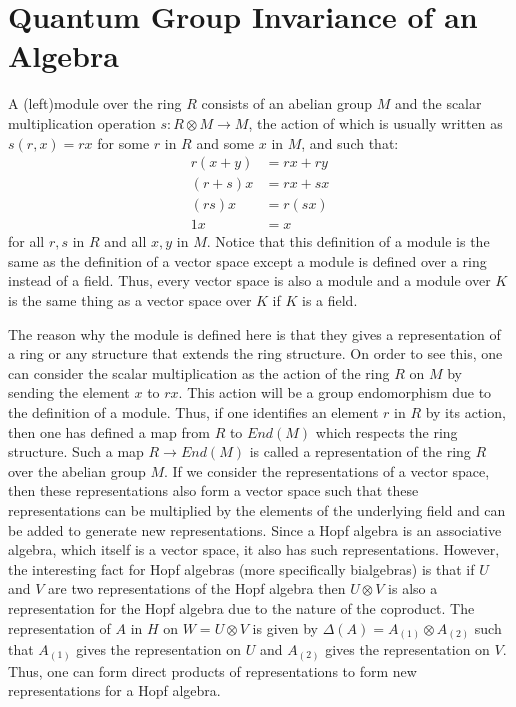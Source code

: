 \section{Quantum Group Invariance of an Algebra}
A (left)module over the ring $R$ consists of an abelian group $M$ and the scalar
multiplication operation $s: R \otimes M \rightarrow M$, the action of which is
usually written as $s(r, x) = rx$ for some $r$ in $R$ and some $x$ in $M$, and such that:
\begin{align}
r(x+y) &= rx+ry \\
(r+s)x &= rx+sx \\
(rs)x &= r(sx) \\
1x &= x
\end{align}
for all $r,s$ in $R$ and all $x, y$ in $M$. Notice that this definition of a module is the same
as the definition of a vector space except a module is defined over a ring instead of a field.
Thus, every vector space is also a module and a module over $K$ is the same thing as a vector
space over $K$ if $K$ is a field.

The reason why the module is defined here is that they gives a representation of a ring or any
structure that extends the ring structure. On order to see this, one can consider the scalar
multiplication as the action of the ring $R$ on $M$ by sending the element $x$ to $rx$. This action
will be a group endomorphism due to the definition of a module. Thus, if one identifies an element
$r$ in $R$ by its action, then one has defined a map from $R$ to $End(M)$ which respects the
ring structure. Such a map $R \rightarrow End(M)$ is called a representation of the ring $R$ over
the abelian group $M$. If we consider the representations of a vector space, then these representations
also form a vector space such that these representations can be multiplied by the elements
of the underlying field and can be added to generate new representations. Since a Hopf algebra
is an associative algebra, which itself is a vector space, it also has such
representations. However, the interesting fact for Hopf algebras (more specifically bialgebras)
is that if $U$ and $V$ are two representations of the Hopf algebra then $U \otimes V$ is also
a representation for the Hopf algebra due to the nature of the coproduct. The representation
of $A$ in $H$ on $W = U \otimes V$ is given by $\Delta(A) = A_{(1)} \otimes A_{(2)}$ such that
$A_{(1)}$ gives the representation on $U$ and $A_{(2)}$ gives the representation on $V$.
Thus, one can form direct products of representations to form new representations for a Hopf
algebra.

